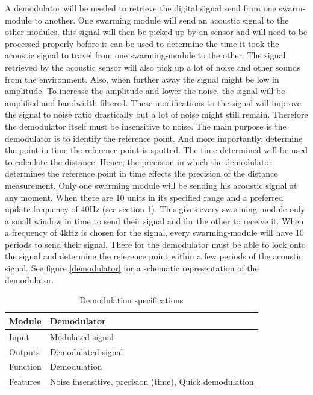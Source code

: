 \documentclass[10pt,a4paper]{article}
\begin{document}
A demodulator will be needed to retrieve the digital signal send from one swarm-module to another.  One swarming module will send an acoustic signal to the other modules, this signal will then be picked up by an sensor and will need to be processed properly before it can be used to determine the time it took the acoustic signal to travel from one swarming-module to the other. The signal retrieved by the acoustic sensor will also pick up a lot of noise and other sounds from the environment. Also, when further away the signal might be low in amplitude. To increase the amplitude and lower the noise, the signal will be amplified and bandwidth filtered. These modifications to the signal will improve the signal to noise ratio drastically but a lot of noise might still remain. Therefore the demodulator itself must be insensitive to noise.  
The main purpose is the demodulator is to identify the reference point. And more importantly, determine the point in time the reference point is spotted. The time determined will be used to calculate the distance. Hence, the precision in which the demodulator determines the reference point in time effects the precision of the distance measurement. Only one swarming module will be sending his acoustic signal at any moment. When there are 10 units in its specified range and a preferred update frequency of 40Hz (see section 1). This gives every swarming-module only a small window in time to send their signal and for the other to receive it. When a frequency of 4kHz is chosen for the signal, every swarming-module will have 10 periods to send their signal. There for the demodulator must be able to lock onto the signal and determine the reference point within a few periods of the acoustic signal. See figure \ref{demodulator} for a schematic representation of the demodulator.

\begin{table}[H]
\centering
\caption{Demodulation specifications}
\label{demosensor}
\begin{tabular}{|p{}|p{}|}
\hline
Module   & Demodulator                                   \\ \hline
Input    & Modulated signal                                             \\ \hline
Outputs  & Demodulated signal                                         \\ \hline
Function & Demodulation \\ \hline
Features & Noise insensitive, precision (time), Quick demodulation  \\ \hline
\end{tabular}
\end{table}
\end{document}
